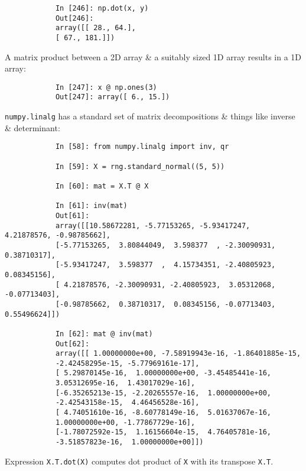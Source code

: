 \documentclass{article}
\begin{document}
\begin{itemize}
\begin{itemize}
		\begin{verbatim}
			In [246]: np.dot(x, y)
			Out[246]:
			array([[ 28., 64.],
			[ 67., 181.]])
		\end{verbatim}
		A matrix product between a 2D array \& a suitably sized 1D array results in a 1D array:
		\begin{verbatim}
			In [247]: x @ np.ones(3)
			Out[247]: array([ 6., 15.])
		\end{verbatim}
		{\tt numpy.linalg} has a standard set of matrix decompositions \& things like inverse \& determinant:
		\begin{verbatim}
			In [58]: from numpy.linalg import inv, qr
			
			In [59]: X = rng.standard_normal((5, 5))
			
			In [60]: mat = X.T @ X
			
			In [61]: inv(mat)
			Out[61]: 
			array([[10.58672281, -5.77153265, -5.93417247,  4.21878576, -0.98785662],
			[-5.77153265,  3.80844049,  3.598377  , -2.30090931,  0.38710317],
			[-5.93417247,  3.598377  ,  4.15734351, -2.40805923,  0.08345156],
			[ 4.21878576, -2.30090931, -2.40805923,  3.05312068, -0.07713403],
			[-0.98785662,  0.38710317,  0.08345156, -0.07713403,  0.55496624]])
			
			In [62]: mat @ inv(mat)
			Out[62]: 
			array([[ 1.00000000e+00, -7.58919943e-16, -1.86401885e-15,
			-2.42458295e-15, -5.77969161e-17],
			[ 5.29870145e-16,  1.00000000e+00, -3.45485441e-16,
			3.05312695e-16,  1.43017029e-16],
			[-6.35265213e-15, -2.20265557e-16,  1.00000000e+00,
			-2.42543158e-15,  4.46456528e-16],
			[ 4.74051610e-16, -8.60778149e-16,  5.01637067e-16,
			1.00000000e+00, -1.77867729e-16],
			[-1.78072592e-15,  1.16156604e-15,  4.76405781e-16,
			-3.51857823e-16,  1.00000000e+00]])
		\end{verbatim}
		Expression {\tt X.T.dot(X)} computes dot product of {\tt X} with its transpose {\tt X.T}.
		

\end{itemize}
\end{itemize}
\end{document}
